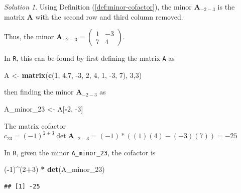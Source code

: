 \documentclass[
]{book}
\newenvironment{Shaded}{\begin{snugshade}}{\end{snugshade}}
\newcommand{\DecValTok}[1]{\textcolor[rgb]{0.00,0.00,0.81}{#1}}
\newcommand{\KeywordTok}[1]{\textcolor[rgb]{0.13,0.29,0.53}{\textbf{#1}}}
\newcommand{\NormalTok}[1]{#1}
\newcommand{\OperatorTok}[1]{\textcolor[rgb]{0.81,0.36,0.00}{\textbf{#1}}}
\newcommand{\StringTok}[1]{\textcolor[rgb]{0.31,0.60,0.02}{#1}}
\theoremstyle{definition}
\theoremstyle{definition}
\theoremstyle{definition}
\theoremstyle{definition}
\theoremstyle{remark}
\newtheorem*{solution}{Solution}
\begin{document}
\begin{solution}

Using Definition (\ref{def:minor-cofactor}), the minor \(\mathbf{A}_{-2-3}\) is the matrix \(\mathbf{A}\) with the second row and third column removed.

Thus, the minor \(\mathbf{A}_{-2-3} = \begin{pmatrix} 1 & -3 \\ 7 & 4 \end{pmatrix}\).

In \texttt{R}, this can be found by first defining the matrix \texttt{A} as

\begin{Shaded}
\begin{Highlighting}[]
\NormalTok{A <-}\StringTok{ }\KeywordTok{matrix}\NormalTok{(}\KeywordTok{c}\NormalTok{(}\DecValTok{1}\NormalTok{, }\DecValTok{4}\NormalTok{,}\DecValTok{7}\NormalTok{, }\DecValTok{-3}\NormalTok{, }\DecValTok{2}\NormalTok{, }\DecValTok{4}\NormalTok{, }\DecValTok{1}\NormalTok{, }\DecValTok{-3}\NormalTok{, }\DecValTok{7}\NormalTok{), }\DecValTok{3}\NormalTok{,}\DecValTok{3}\NormalTok{)}
\end{Highlighting}
\end{Shaded}

then finding the minor \(\mathbf{A}_{-2-3}\) as

\begin{Shaded}
\begin{Highlighting}[]
\NormalTok{A_minor_}\DecValTok{23}\NormalTok{ <-}\StringTok{ }\NormalTok{A[}\OperatorTok{-}\DecValTok{2}\NormalTok{, }\DecValTok{-3}\NormalTok{]}
\end{Highlighting}
\end{Shaded}

The matrix cofactor \(c_{23} = (-1)^{2+3} \det \mathbf{A}_{-2-3} = (-1) * ((1)(4) - (-3) (7)) = -25\)

In \texttt{R}, given the minor \texttt{A\_minor\_23}, the cofactor is

\begin{Shaded}
\begin{Highlighting}[]
\NormalTok{(}\OperatorTok{-}\DecValTok{1}\NormalTok{)}\OperatorTok{^}\NormalTok{(}\DecValTok{2}\OperatorTok{+}\DecValTok{3}\NormalTok{) }\OperatorTok{*}\StringTok{ }\KeywordTok{det}\NormalTok{(A_minor_}\DecValTok{23}\NormalTok{)}
\end{Highlighting}
\end{Shaded}

\begin{verbatim}
## [1] -25
\end{verbatim}

\end{solution}
\end{document}
